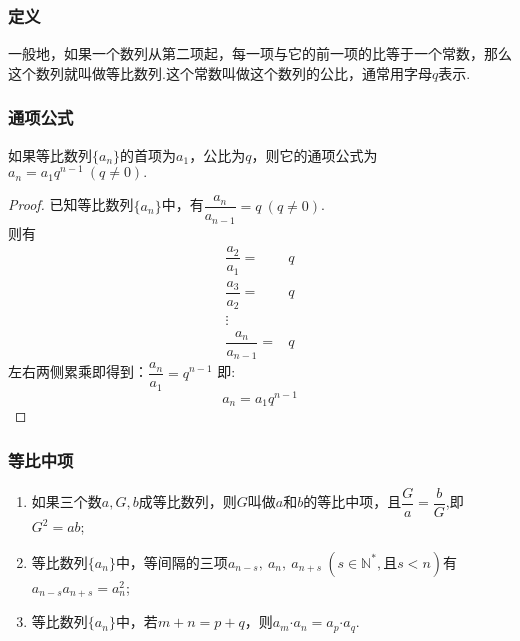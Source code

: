 \documentclass{BHCexam}
\begin{document}
\subsubsection{定义}
一般地，如果一个数列从第二项起，每一项与它的前一项的比等于一个常数，那么这个数列就叫做等比数列.这个常数叫做这个数列的公比，通常用字母$ q $表示.
\subsubsection{通项公式}
如果等比数列$\{a_n\}$的首项为$a_1$，公比为$ q $，则它的通项公式为$ a_n=a_1q^{n-1}~(q\ne0). $
\begin{proof}
已知等比数列$\{a_n\}$中，有$\dfrac{a_n}{a_{n-1}}=q~(q\ne0)$.\\
则有$$ \begin{aligned}
\dfrac{a_2}{a_1}=&q\\
\dfrac{a_3}{a_2}=&q\\
\vdots&\\
\dfrac{a_n}{a_{n-1}}=&q 
\end{aligned}
$$
左右两侧累乘即得到：$\dfrac{a_n}{a_1}=q^{n-1}$
即:$$ a_n=a_1q^{n-1} $$
\end{proof}
\subsubsection{等比中项}
\begin{enumerate}[(1)]
\item 如果三个数$ a,G,b $成等比数列，则$ G $叫做$ a $和$ b $的等比中项，且$ \dfrac{G}{a}=\dfrac{b}{G} $,即$ G^2=ab $;
\item 等比数列$ \{a_n\} $中，等间隔的三项$ a_{n-s},~a_n,~a_{n+s}~(s\in\mathbb{N^*},\text{且} s<n ) $有$ a_{n-s}a_{n+s}=a_n^2 $;
\item 等比数列$ \{a_n\} $中，若$ m+n=p+q $，则$ a_m\bm{\cdot}a_n=a_p\bm{\cdot}a_q $.
\end{enumerate}
\end{document}

